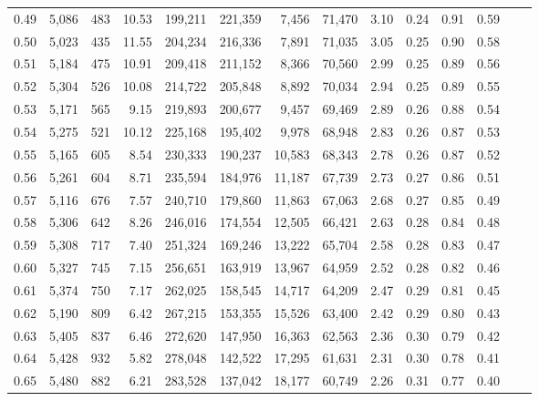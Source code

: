 \begin{tabular}{rrrrrrrrrrrrrr}
0.49 &  5,086 &    483 &   10.53 &  199,211 &  221,359 &   7,456 &  71,470 &  3.10 &  0.24 &  0.91 &      0.59 \\
0.50 &  5,023 &    435 &   11.55 &  204,234 &  216,336 &   7,891 &  71,035 &  3.05 &  0.25 &  0.90 &      0.58 \\
0.51 &  5,184 &    475 &   10.91 &  209,418 &  211,152 &   8,366 &  70,560 &  2.99 &  0.25 &  0.89 &      0.56 \\
0.52 &  5,304 &    526 &   10.08 &  214,722 &  205,848 &   8,892 &  70,034 &  2.94 &  0.25 &  0.89 &      0.55 \\
0.53 &  5,171 &    565 &    9.15 &  219,893 &  200,677 &   9,457 &  69,469 &  2.89 &  0.26 &  0.88 &      0.54 \\
0.54 &  5,275 &    521 &   10.12 &  225,168 &  195,402 &   9,978 &  68,948 &  2.83 &  0.26 &  0.87 &      0.53 \\
0.55 &  5,165 &    605 &    8.54 &  230,333 &  190,237 &  10,583 &  68,343 &  2.78 &  0.26 &  0.87 &      0.52 \\
0.56 &  5,261 &    604 &    8.71 &  235,594 &  184,976 &  11,187 &  67,739 &  2.73 &  0.27 &  0.86 &      0.51 \\
0.57 &  5,116 &    676 &    7.57 &  240,710 &  179,860 &  11,863 &  67,063 &  2.68 &  0.27 &  0.85 &      0.49 \\
0.58 &  5,306 &    642 &    8.26 &  246,016 &  174,554 &  12,505 &  66,421 &  2.63 &  0.28 &  0.84 &      0.48 \\
0.59 &  5,308 &    717 &    7.40 &  251,324 &  169,246 &  13,222 &  65,704 &  2.58 &  0.28 &  0.83 &      0.47 \\
0.60 &  5,327 &    745 &    7.15 &  256,651 &  163,919 &  13,967 &  64,959 &  2.52 &  0.28 &  0.82 &      0.46 \\
0.61 &  5,374 &    750 &    7.17 &  262,025 &  158,545 &  14,717 &  64,209 &  2.47 &  0.29 &  0.81 &      0.45 \\
0.62 &  5,190 &    809 &    6.42 &  267,215 &  153,355 &  15,526 &  63,400 &  2.42 &  0.29 &  0.80 &      0.43 \\
0.63 &  5,405 &    837 &    6.46 &  272,620 &  147,950 &  16,363 &  62,563 &  2.36 &  0.30 &  0.79 &      0.42 \\
0.64 &  5,428 &    932 &    5.82 &  278,048 &  142,522 &  17,295 &  61,631 &  2.31 &  0.30 &  0.78 &      0.41 \\
0.65 &  5,480 &    882 &    6.21 &  283,528 &  137,042 &  18,177 &  60,749 &  2.26 &  0.31 &  0.77 &      0.40 \\

\end{tabular}
